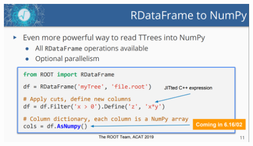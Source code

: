 \documentclass[aspectratio=169]{beamer}
\begin{document}
\begin{frame}{}
\vspace{-0.1 cm}
\begin{columns}
\includegraphics[width=\linewidth]{03-coming-soon-2.png}
\end{columns}
\end{frame}

\begin{frame}{}



\end{frame}
\end{document}
